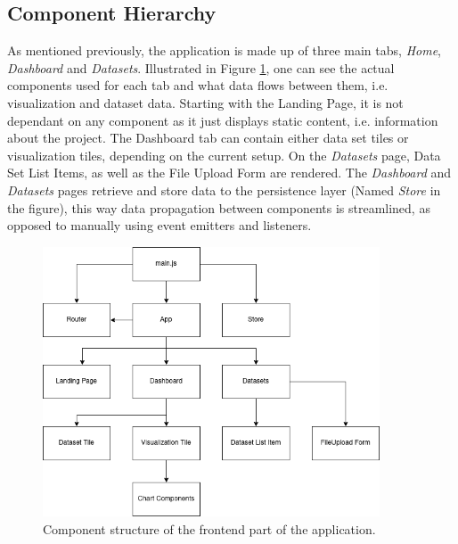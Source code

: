  \subsection{Component Hierarchy}
 As mentioned previously, the application is made up of three main tabs, \emph{Home}, \emph{Dashboard} and \emph{Datasets}. Illustrated in Figure \ref{fig:frontentHierarchy}, one can see the actual components used for each tab and what data flows between them, i.e. visualization and dataset data.
Starting with the Landing Page, it is not dependant on any component as it just displays static content, i.e. information about the project. The Dashboard tab can contain either data set tiles or visualization tiles, depending on the current setup. On the \emph{Datasets} page, Data Set List Items, as well as the File Upload Form are rendered. The \emph{Dashboard} and \emph{Datasets} pages retrieve and store data to the persistence layer (Named \emph{Store} in the figure), this way data propagation between components is streamlined, as opposed to manually using event emitters and listeners.

\begin{figure}
    \centering
    \includegraphics[width=10cm]{images/frontend_hierarchy.png}
    \caption{Component structure of the frontend part of the application.}
    \label{fig:frontentHierarchy}
\end{figure}